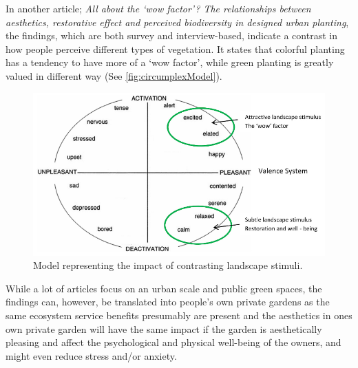In another article; \textit{All about the ‘wow factor’? The relationships between aesthetics, restorative effect and perceived biodiversity in designed urban planting}\cite{wowFactor}, the findings, which are both survey and interview-based, indicate a contrast in how people perceive different types of vegetation. It states that colorful planting has a tendency to have more of a ‘wow factor’, while green planting is greatly valued in different way (See \autoref{fig:circumplexModel}).

\begin{figure}[H]
	\centering
	\includegraphics[width=0.9\linewidth]{figure/Analysis/circomplexModel.png}
	\caption{Model representing the impact of contrasting landscape stimuli.\cite{wowFactor}}
	\label{fig:circumplexModel}
\end{figure}

While a lot of articles focus on an urban scale and public green spaces, the findings can, however, be translated into people's own private gardens as the same ecosystem service benefits presumably are present and the aesthetics in ones own private garden will have the same impact if the garden is aesthetically pleasing and affect the psychological and physical well-being of the owners, and might even reduce stress and/or anxiety\cite{humanResponsesToLandscapes}.

